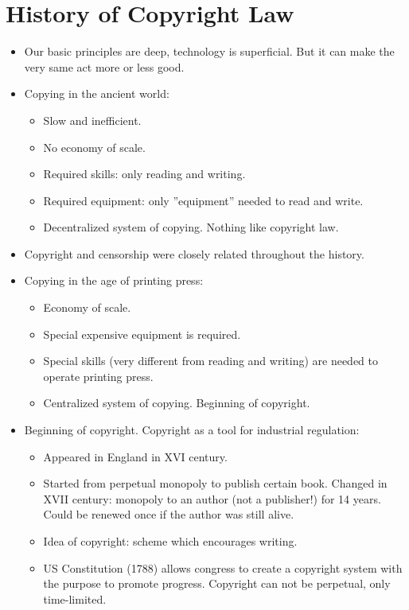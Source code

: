 \documentclass[twoside,openright]{report}
\begin{document}
\section{History of Copyright Law}
\begin{itemize}
 \item    Our basic principles are deep, technology is superficial. But it can make the very same act more or less good.
 \item    Copying in the ancient world:
\begin{itemize}
 \item        Slow and inefficient.
 \item        No economy of scale.
 \item        Required skills: only reading and writing.
 \item        Required equipment: only ''equipment'' needed to read and write.
 \item        Decentralized system of copying. Nothing like copyright law.
\end{itemize}
 \item    Copyright and censorship were closely related throughout the history.
 \item    Copying in the age of printing press:
\begin{itemize}
 \item        Economy of scale.
 \item        Special expensive equipment is required.
 \item        Special skills (very different from reading and writing) are needed to operate printing press.
 \item        Centralized system of copying. Beginning of copyright.
\end{itemize}
 \item    Beginning of copyright. Copyright as a tool for industrial regulation:
\begin{itemize}
 \item        Appeared in England in XVI century.
 \item        Started from perpetual monopoly to publish certain book. Changed in XVII century: monopoly to an author (not a publisher!) for 14 years. Could be renewed once if the author was still alive.
 \item        Idea of copyright: scheme which encourages writing.
 \item        US Constitution (1788) allows congress to create a copyright system with the purpose to promote progress. Copyright can not be perpetual, only time-limited.

\end{itemize}
\end{itemize}
\end{document}
